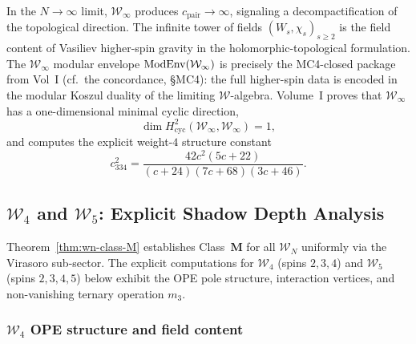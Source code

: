 \begin{remark}
\label{rem:winfty-higher-spin}
In the $N \to \infty$ limit, $\mathcal{W}_\infty$ produces
$c_{\mathrm{pair}} \to \infty$, signaling a decompactification of the
topological direction. The infinite tower of fields
$(W_s, \chi_s)_{s \geq 2}$ is the field content of Vasiliev
higher-spin gravity in the holomorphic-topological formulation. The
$\mathcal{W}_\infty$ modular envelope $\operatorname{ModEnv}(\mathcal{W}_\infty)$ is
precisely the MC4-closed package from Vol~I
\textup{(}cf.~the concordance, \S\textup{MC4}\textup{)}: the full higher-spin
data is encoded in the modular Koszul duality of the limiting
$\mathcal{W}$-algebra.
Volume~I proves that $\mathcal{W}_\infty$ has a one-dimensional
minimal cyclic direction,
\[
\dim H^2_{\mathrm{cyc}}(\mathcal{W}_\infty, \mathcal{W}_\infty)=1,
\]
and computes the explicit weight-$4$ structure constant
\[
c_{334}^2=\frac{42c^2(5c+22)}{(c+24)(7c+68)(3c+46)}.
\]
\end{remark}


\subsection{$\mathcal{W}_4$ and $\mathcal{W}_5$:
Explicit Shadow Depth Analysis}
\label{subsec:w4-w5-analysis}

Theorem~\ref{thm:wn-class-M} establishes Class~$\mathbf{M}$
for all $\mathcal{W}_N$ uniformly via the Virasoro sub-sector.
The explicit computations for $\mathcal{W}_4$
(spins $2,3,4$) and $\mathcal{W}_5$ (spins $2,3,4,5$) below
exhibit the OPE pole structure, interaction vertices,
and non-vanishing ternary operation $m_3$.

\subsubsection{$\mathcal{W}_4$ OPE structure and field content}

